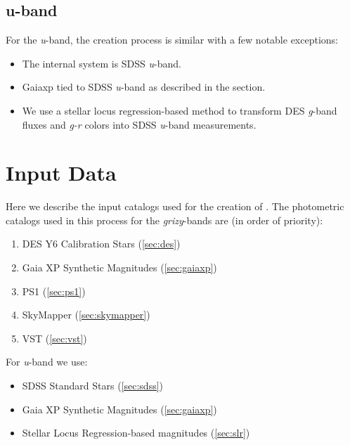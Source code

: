 \subsection{u-band}
For the \textit{u}-band, the creation process is similar with a few notable exceptions:
\begin{itemize}
    \item The internal system is SDSS \textit{u}-band.
    \item Gaiaxp tied to SDSS \textit{u}-band as described in the section.
    \item We use a stellar locus regression-based method to transform DES \textit{g}-band fluxes and \textit{g-r} colors into SDSS \textit{u}-band measurements.
\end{itemize}

\section{Input Data}
\label{sec:input}
Here we describe the input catalogs used for the creation of \monster. 
The photometric catalogs used in this process for the \emph{grizy}-bands are (in order of priority):
\begin{enumerate}
    \item DES Y6 Calibration Stars (\ref{sec:des})
    \item Gaia XP Synthetic Magnitudes (\ref{sec:gaiaxp})
    \item PS1 (\ref{sec:ps1})
    \item SkyMapper (\ref{sec:skymapper})
    \item VST (\ref{sec:vst})
\end{enumerate}

For \textit{u}-band we use:
\begin{itemize}
    \item SDSS Standard Stars (\ref{sec:sdss})
    \item Gaia XP Synthetic Magnitudes (\ref{sec:gaiaxp})
    \item Stellar Locus Regression-based magnitudes (\ref{sec:slr})
\end{itemize}

